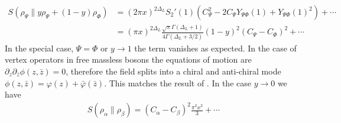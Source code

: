 \documentclass[11pt]{article}
\newcommand{\nn}{\nonumber}
\newcommand{\lb}{\left(}
\newcommand{\rb}{\right)}
\newcommand{\NL}[1]{\textcolor{blue}{#1}}
\begin{document}
   \begin{align}
  S(\rho_{\Psi}\|y\rho_{\Psi}+(1-y)\rho_{\Phi}) & = (2\pi x)^{2\Delta_L}S_{2}'(1)(C_{\Psi}^{2}-2C_{\Psi}Y_{\Psi\Phi}(1)+Y_{\Psi\Phi}(1)^{2})+\cdots\nn                \\
   & =(\pi x)^{2\Delta_L}\frac{\sqrt{\pi}\Gamma(\Delta_{L}+1)}{4\Gamma(\Delta_{L}+3/2)}(1-y)^{2}(C_{\Psi}-C_{\Phi})^{2}+\cdots
  \end{align}
  In the special case,
  $\Psi =\Phi$ or $y\to 1$ the term vanishes as expected. In the case of vertex
  operators in free massless bosons the equations of motion are $\partial_z\partial_{\bar{z}}\phi(z,\bar{z})=0$, therefore the field splits into a chiral and anti-chiral mode $\phi(z,\bar{z})=\varphi(z)+\bar{\varphi}(\bar{z})$. This matches the result of \cite{Lashkari_2014,S_rosi_2016}. In the case $y\to 0$ we have
 \begin{align}
  S(\rho_\alpha\|\rho_\beta)=(C_\alpha-C_\beta)^2\frac{\pi^2 x^2}{3}+\cdots 
 \end{align}

  

\end{document}
